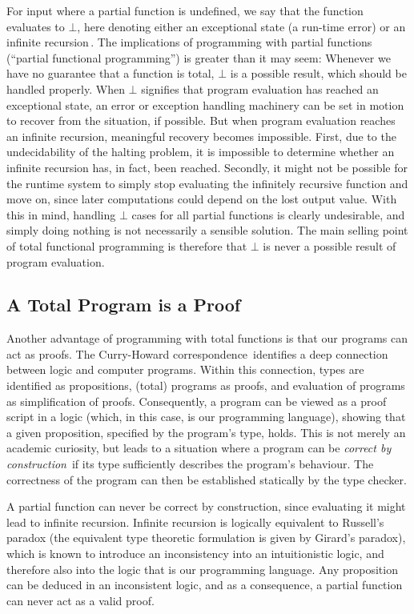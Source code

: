 For input  where a partial function is undefined, we say that
the function evaluates to $\bot$, here denoting either an exceptional state (a
run-time error) or an infinite recursion\,\citep{Turner04totalfunctional}. The
implications of programming with partial functions (``partial functional
programming'') is greater than it may seem: Whenever we have no guarantee that a
function is total, $\bot$ is a possible result, which should be handled
properly. When $\bot$ signifies that program evaluation has reached an
exceptional state, an error or exception handling machinery can be set in motion
to recover from the situation, if possible. But when program evaluation reaches
an infinite recursion, meaningful recovery becomes impossible. First, due to the
undecidability of the halting problem, it is impossible to determine whether an
infinite recursion has, in fact, been reached. Secondly, it might not be
possible for the runtime system to simply stop evaluating the infinitely
recursive function and move on, since later computations could depend on the lost
output value. With this in mind, handling $\bot$ cases for all partial functions
is clearly undesirable, and simply doing nothing is not necessarily a sensible
solution. The main selling point of total functional programming is therefore
that $\bot$ is never a possible result of program evaluation.

\subsection{A Total Program is a Proof}
Another advantage of programming with total functions is that our programs can
act as proofs. The Curry-Howard correspondence\,\citep{Wadler2014} identifies a
deep connection between logic and computer programs. Within this connection,
types are identified as propositions, (total) programs as proofs, and evaluation of
programs as simplification of proofs. Consequently, a program can be viewed as a
proof script in a logic (which, in this case, is our programming language),
showing that a given proposition, specified by the program's type, holds. This
is not merely an academic curiosity, but leads to a situation where a program can
be \emph{correct by construction}\,\citep{Pierce:2002:TPL:509043} if its type
sufficiently describes the program's behaviour. The correctness of the program
can then be established statically by the type checker.

A partial function can never be correct by construction, since evaluating it
might lead to infinite recursion. Infinite recursion is logically equivalent to
Russell's paradox (the equivalent type theoretic formulation is given by
Girard's paradox), which is known to introduce an inconsistency into an
intuitionistic logic, and therefore also into the logic that is our programming
language. Any proposition can be deduced in an inconsistent logic, and as a
consequence, a partial function can never act as a valid proof.

